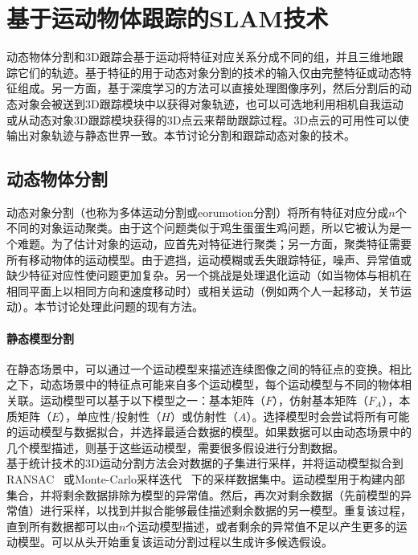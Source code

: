 \section{基于运动物体跟踪的SLAM技术}
\label{subsec:object_tracking}

动态物体分割和3D跟踪会基于运动将特征对应关系分成不同的组，并且三维地跟踪它们的轨迹。基于特征的用于动态对象分割的技术的输入仅由完整特征或动态特征组成。另一方面，基于深度学习的方法可以直接处理图像序列，然后分割后的动态对象会被送到3D跟踪模块中以获得对象轨迹，也可以可选地利用相机自我运动或从动态对象3D跟踪模块获得的3D点云来帮助跟踪过程。3D点云的可用性可以使输出对象轨迹与静态世界一致。本节讨论分割和跟踪动态对象的技术。

\subsection{动态物体分割}
动态对象分割（也称为多体运动分割或eorumotion分割）将所有特征对应分成$n$个不同的对象运动聚类。由于这个问题类似于鸡生蛋蛋生鸡问题，所以它被认为是一个难题。为了估计对象的运动，应首先对特征进行聚类；另一方面，聚类特征需要所有移动物体的运动模型。由于遮挡，运动模糊或丢失跟踪特征，噪声、异常值或缺少特征对应性使问题更加复杂。另一个挑战是处理退化运动（如当物体与相机在相同平面上以相同方向和速度移动时）或相关运动（例如两个人一起移动，关节运动）。本节讨论处理此问题的现有方法。

\paragraph{静态模型分割}
在静态场景中，可以通过一个运动模型来描述连续图像之间的特征点的变换。相比之下，动态场景中的特征点可能来自多个运动模型，每个运动模型与不同的物体相关联。运动模型可以基于以下模型之一：基本矩阵（$F$），仿射基本矩阵（$F_A$），本质矩阵（$E$），单应性/投射性（$H$）或仿射性（$A$）。选择模型时会尝试将所有可能的运动模型与数据拟合，并选择最适合数据的模型。如果数据可以由动态场景中的几个模型描述，则基于这些运动模型，需要很多假设进行分割数据。\\

基于统计技术的3D运动分割方法会对数据的子集进行采样，并将运动模型拟合到RANSAC~\cite{Fischler1981random}
或Monte-Carlo采样迭代~\cite{schindler2006two}
下的采样数据集中。运动模型用于构建内部集合，并将剩余数据排除为模型的异常值。然后，再次对剩余数据（先前模型的异常值）进行采样，以找到并拟合能够最佳描述剩余数据的另一模型。重复该过程，直到所有数据都可以由$n$个运动模型描述，或者剩余的异常值不足以产生更多的运动模型。可以从头开始重复该运动分割过程以生成许多候选假设。\\

